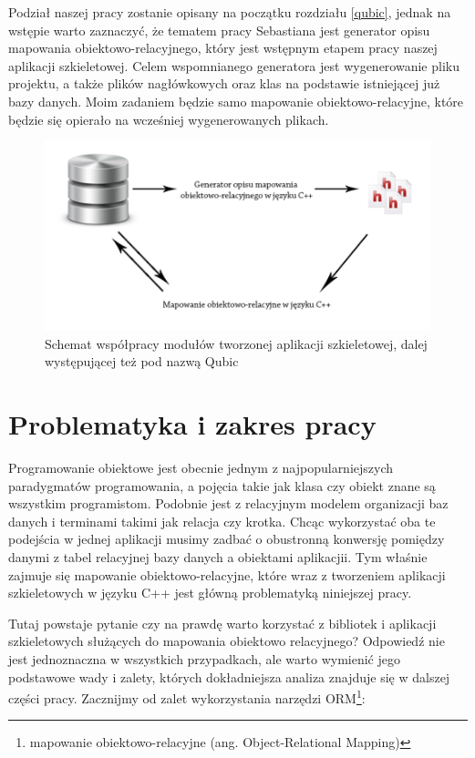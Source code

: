 \documentclass[12pt]{report}
\begin{document}
Podział naszej pracy zostanie opisany na początku rozdziału \ref{qubic}, jednak na wstępie warto zaznaczyć, że tematem pracy Sebastiana jest generator opisu mapowania 
obiektowo-relacyjnego, który jest wstępnym etapem pracy naszej aplikacji szkieletowej. Celem wspomnianego generatora jest wygenerowanie pliku projektu, a także plików
nagłówkowych oraz klas na podstawie istniejącej już bazy danych. Moim zadaniem będzie samo mapowanie obiektowo-relacyjne, które będzie się opierało na wcześniej
wygenerowanych plikach. 

\begin{figure}[h]
\centering
\includegraphics[width=\textwidth]{resources/coop.png}
\caption[Schemat współpracy modułów tworzonej aplikacji szkieletowej]{Schemat współpracy modułów tworzonej aplikacji szkieletowej, dalej występującej też pod nazwą Qubic}
\end{figure}

\section{Problematyka i zakres pracy}

Programowanie obiektowe jest obecnie jednym z najpopularniejszych pa\-ra\-dy\-gma\-tów programowania, a pojęcia takie jak klasa czy obiekt znane są wszystkim programistom.
Podobnie jest z relacyjnym modelem organizacji baz danych i terminami takimi jak relacja czy krotka. Chcąc wykorzystać oba te podejścia w jednej aplikacji musimy zadbać o 
obustronną konwersję pomiędzy danymi z tabel relacyjnej bazy danych a obiektami aplikacjii. Tym właśnie zajmuje się mapowanie obiektowo-relacyjne, które wraz z tworzeniem 
aplikacji szkieletowych w języku C++ jest główną problematyką niniejszej pracy.

Tutaj powstaje pytanie czy na prawdę warto korzystać z bibliotek i aplikacji szkieletowych służących do mapowania obiektowo relacyjnego? Od\-po\-wiedź nie jest
jednoznaczna w wszystkich przypadkach, ale warto wymienić jego podstawowe wady i zalety, których dokładniejsza analiza znajduje się w dalszej części pracy. Zacznijmy od zalet 
wykorzystania narzędzi ORM\footnote{mapowanie obiektowo-relacyjne (ang. Object-Relational Mapping)}:
\end{document}
